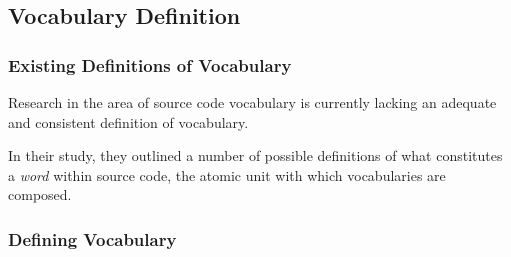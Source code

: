 \subsection{Vocabulary Definition} %
\label{ssec:vocabulary_definition}



\subsubsection{Existing Definitions of Vocabulary} %
\label{ssub:existing_definitions_of_vocabulary}

Research in the area of source code vocabulary is currently lacking an adequate and consistent definition of vocabulary.



In their study, they outlined a number of possible definitions of what constitutes a \emph{word} within source code, the atomic unit with which vocabularies are composed.







\subsubsection{Defining Vocabulary} %
\label{ssub:defining_vocabulary}


